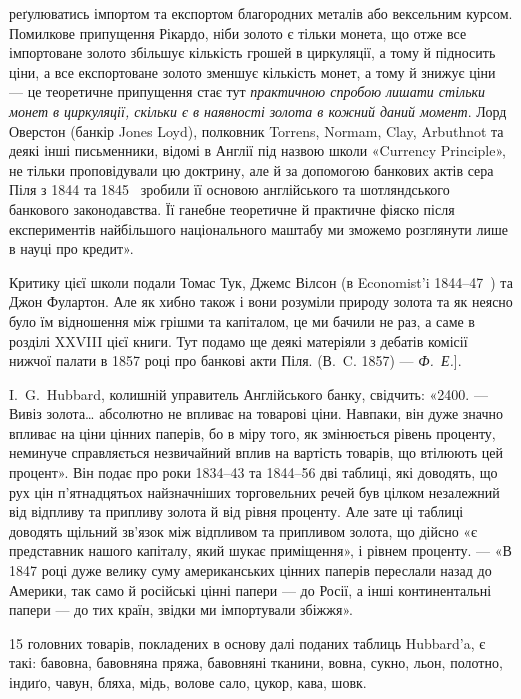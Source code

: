 \parcont{}  %
реґулюватись імпортом та експортом благородних металів або вексельним курсом.
Помилкове припущення Рікардо, ніби золото є тільки монета, що отже все імпортоване
золото збільшує кількість грошей в циркуляції, а тому й підносить ціни,
а все експортоване золото зменшує кількість монет, а тому й знижує ціни —
це теоретичне припущення стає тут \emph{практичною спробою лишати стільки
монет в циркуляції, скільки є в наявності золота в кожний даний
момент}. Лорд Оверстон (банкір Jones Loyd), полковник Torrens, Normam, Clay,
Arbuthnot та деякі інші письменники, відомі в Англії під назвою школи «Currency
Principle», не тільки проповідували цю доктрину, але й за допомогою банкових
актів сера Піля з 1844 та 1845~ зробили її основою англійського та шотляндського
банкового законодавства. Її ганебне теоретичне й практичне фіяско після
експериментів найбільшого національного маштабу ми зможемо розглянути лише
в науці про кредит».

Критику цієї школи подали Томас Тук, Джемс Вілсон (в Economist’i 1844--47~)
та Джон Фулартон. Але як хибно також і вони розуміли природу золота
та як неясно було їм відношення між грішми та капіталом, це ми бачили не
раз, а саме в розділі XXVIII цієї книги. Тут подамо ще деякі матеріяли з дебатів
комісії нижчої палати в 1857 році про банкові акти Піля. (В.~C. 1857) — \emph{Ф.~Е.}].

I.~G.~Hubbard, колишній управитель Англійського банку, свідчить: «2400. —
Вивіз золота\dots{} абсолютно не впливає на товарові ціни. Навпаки, він дуже
значно впливає на ціни цінних паперів, бо в міру того, як змінюється рівень
проценту, неминуче справляється незвичайний вплив на вартість товарів, що втілюють
цей процент». Він подає про роки 1834--43 та 1844--56 дві таблиці,
які доводять, що рух цін п’ятнадцятьох найзначніших торговельних речей був
цілком незалежний від відпливу та припливу золота й від рівня проценту. Але
зате ці таблиці доводять щільний зв’язок між відпливом та припливом золота,
що дійсно «є представник нашого капіталу, який шукає приміщення», і рівнем
проценту. — «В 1847 році дуже велику суму американських цінних паперів переслали
назад до Америки, так само й російські цінні папери — до Росії, а інші
континентальні папери — до тих країн, звідки ми імпортували збіжжя».

15 головних товарів, покладених в основу далі поданих таблиць Hubbard’a,
є такі: бавовна, бавовняна пряжа, бавовняні тканини, вовна, сукно,
льон, полотно, індиґо, чавун, бляха, мідь, волове сало, цукор, кава, шовк.

